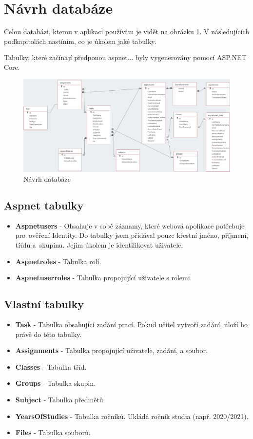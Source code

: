 \documentclass[a4paper, 12pt]{report}
\begin{document}
	\section{Návrh databáze}
	Celou databázi, kterou v aplikaci používám je vidět na obrázku \ref{NavrhDatabaze}. V následujících podkapitolách nastíním, co je úkolem jaké tabulky.\par
	Tabulky, které začínají předponou aspnet... byly vygenerovány pomocí ASP.NET Core.
	\begin{figure}[h!]
		\includegraphics[width=\textwidth]{Databaze}
		\caption{Návrh databáze}
		\label{NavrhDatabaze}
	\end{figure}

	\subsection{Aspnet tabulky}
	\begin{itemize}
		\item \textbf{Aspnetusers} - Obsahuje v sobě záznamy, které webová apolikace potřebuje pro~ověření Identity. Do tabulky jsem přidával pouze křestní jméno, příjmení, třídu a~skupinu. Jejím úkolem je identifikovat uživatele.
		\item \textbf{Aspnetroles} - Tabulka rolí.
		\item \textbf{Aspnetuserroles} - Tabulka propojující uživatele s rolemi.
	\end{itemize}

	\subsection{Vlastní tabulky}
	\begin{itemize}
		\item \textbf{Task} - Tabulka obsahující zadání prací. Pokud učitel vytvoří zadání, uloží ho právě do této tabulky.
		\item \textbf{Assignments} - Tabulka propojující uživatele, zadání, a soubor.
		\item \textbf{Classes} - Tabulka tříd.
		\item \textbf{Groups} - Tabulka skupin.
		\item \textbf{Subject} - Tabulka předmětů.
		\item \textbf{YearsOfStudies} - Tabulka ročníků. Ukládá ročník studia (např. 2020/2021).
		\item \textbf{Files} - Tabulka souborů.
	\end{itemize}
\end{document}

